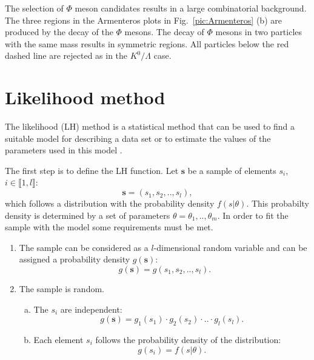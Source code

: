 The selection of $\Phi$ meson candidates results in a large combinatorial background. The three regions in the Armenteros plots in Fig.~\ref{pic:Armenteros} (b) are produced by the decay of the $\Phi$ mesons. The decay of $\Phi$ mesons in two particles with the same mass results in symmetric regions. All particles below the red dashed line are rejected as in the $K^0/\Lambda$ case.

\section{Likelihood method}

The likelihood (LH) method is a statistical method that can be used to find a suitable model for describing a data set or to estimate the values of the parameters used in this model \cite{LH1,LH2}.

The first step is to define the LH function. Let $\mathbf{s}$ be a sample of elements $s_i$, $i \in \llbracket 1,l \rrbracket$:
%
\begin{equation}
  \mathbf{s} = \left( s_1,s_2,..,s_l \right),
\end{equation}
%
which follows a distribution with the probability density $f(s|\theta)$. This probabilty density is determined by a set of parameters $\theta = \theta_1,..,\theta_m$. In order to fit the sample with the model some requirements must be met.

\begin{enumerate}
  \item The sample can be considered as a $l$-dimensional random variable and can be assigned a probability density $g(\mathbf{s})$:
  \begin{equation}
    g(\mathbf{s}) = g\left( s_1,s_2,..,s_l \right).
  \end{equation}
  \item The sample is random.
  \begin{enumerate}[(a)]
    \item The $s_i$ are independent:
    \begin{equation}
      g(\mathbf{s}) = g_1\left(s_1 \right) \cdot g_2\left(s_2 \right) \cdot .. \cdot g_l\left(s_l \right).
    \end{equation}
    \item Each element $s_i$ follows the probability density of the distribution:
    \begin{equation}
      g(s_i) = f(s|\theta).
    \end{equation}
  \end{enumerate}
\end{enumerate}

